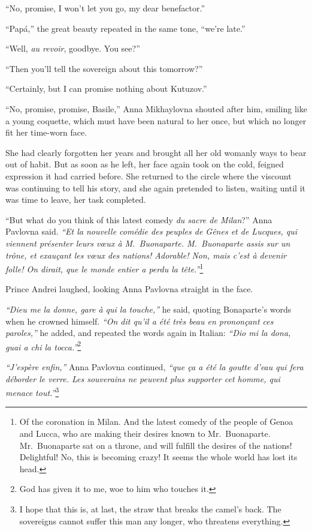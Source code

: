 ``No, promise, I won't let you go, my dear benefactor.''

``Pap\'a,'' the great beauty repeated in the same tone, ``we're
late.''

``Well, \textit{au revoir}, goodbye. You see?''

``Then you'll tell the sovereign about this tomorrow?''

``Certainly, but I can promise nothing about Kutuzov.''

``No, promise, promise, Basile,'' Anna Mikhaylovna shouted after him,
smiling like a young coquette, which must have been natural to her
once, but which no longer fit her time-worn face.

She had clearly forgotten her years and brought all her old womanly
ways to bear out of habit. But as soon as he left, her face again took
on the cold, feigned expression it had carried before.  She returned
to the circle where the viscount was continuing to tell his story, and
she again pretended to listen, waiting until it was time to leave, her
task completed.

``But what do you think of this latest comedy \textit{du sacre de
  Milan}?'' Anna Pavlovna said. \textit{``Et la nouvelle com\'edie des
  peuples de G\^enes et de Lucques, qui viennent pr\'esenter leurs
  v\oe ux \`a M.~Buonaparte. M.~Buonaparte assis sur un tr\^one, et
  exau\c{c}ant les v\oe ux des nations! Adorable! Non, mais c'est \`a
  devenir folle! On dirait, que le monde entier a perdu la
  t\^ete.''}\footnote{Of the coronation in Milan. And the latest
  comedy of the people of Genoa and Lucca, who are making their
  desires known to Mr.~Buonaparte. Mr.~Buonaparte sat on a throne, and
  will fulfill the desires of the nations! Delightful! No, this is
  becoming crazy! It seems the whole world has lost its head.}

Prince Andrei laughed, looking Anna Pavlovna straight in the face.

\textit{``Dieu me la donne, gare \`a qui la touche,''} he said,
quoting Bonaparte's words when he crowned himself. \textit{``On dit
  qu'il a \'et\'e tr\`es beau en pronon\c{c}ant ces paroles,''} he
added, and repeated the words again in Italian: \textit{``Dio mi la
  dona, guai a chi la tocca.''}\footnote{God has given it to me, woe
  to him who touches it.}

\textit{``J'esp\`ere enfin,''} Anna Pavlovna continued, \textit{``que
  \c{c}a a \'et\'e la goutte d'eau qui fera d\'eborder le verre. Les
  souverains ne peuvent plus supporter cet homme, qui menace
  tout.''}\footnote{I hope that this is, at last, the straw that
  breaks the camel's back. The sovereigns cannot suffer this man any
  longer, who threatens everything.}

